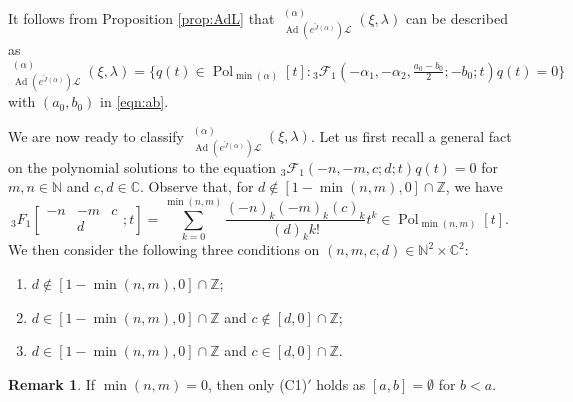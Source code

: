 \documentclass[a4paper,11pt,reqno]{amsart}
\newcommand{\CC}{\mathbb{C}}
\newcommand{\NN}{\mathbb{N}}
\newcommand{\calF}{\mathcal{F}}
\newcommand{\calL}{\mathcal{L}}
\newcommand{\0}{{\bf 0}}
\newcommand{\N}{\mathbb{N}}
\newcommand{\Z}{\mathbb{Z}}
\newcommand{\C}{\mathbb{C}}
\newcommand{\1}{{\bf 1}}
\DeclareMathOperator{\Ad}{Ad}
\DeclareMathOperator{\Pol}{Pol}
\DeclareMathOperator{\Sol}{Sol}
\newcommand{\wJ}{\widetilde{J}}
\DeclareMathOperator{\wSol}{\widetilde{\Sol}}
\theoremstyle{plain}
\theoremstyle{definition}
\newtheorem{remark}[equation]{Remark}
\numberwithin{equation}{section}
\theoremstyle{definition}
\begin{document}
It follows from Proposition \ref{prop:AdL} that 
$\wSol_{\Ad(e^{\wJ(\alpha)}) \calL}^{(\alpha)}(\xi,\lambda)$ can be described as
\begin{equation}\label{eqn:AdSol3F1}
\wSol_{\Ad(e^{\wJ(\alpha)}) \calL}^{(\alpha)}(\xi,\lambda)
=\{q(t) \in \Pol_{\min(\alpha)}[t] : 
{}_3\calF_1(-\alpha_1,-\alpha_2,\tfrac{a_0-b_0}{2};-b_0;t)q(t)=0\}
\end{equation}
with $(a_0, b_0)$ in \eqref{eqn:ab}.

We are now ready to classify 
$\wSol_{\Ad(e^{\wJ(\alpha)}) \calL}^{(\alpha)}(\xi,\lambda)$.
Let us first recall a general fact on the polynomial solutions 
to the equation
${}_3\calF_1(-n,-m,c;d;t)q(t)=0$ for $m, n \in \NN$ and $c, d \in\CC$.
Observe that, for $d \notin [1-\min(n,m),0]\cap \Z$, we have
\begin{equation*}
{}_3F_1\left [\begin{matrix}
    -n& -m & c \\
   & d &  
\end{matrix};t\right ]=\sum_{k=0}^{\min(n,m)}\frac{(-n)_k(-m)_k(c)_k}{(d)_kk!}t^k
\in \Pol_{\min(n,m)}[t].
\end{equation*}
We then consider the following 
three conditions on $(n,m,c, d) \in \N^2\times \C^2$:
\vspace{2pt}
\begin{enumerate}[label=\normalfont{(\arabic*)}]
\item[(C1)$'$] $d \notin [1-\min(n,m),0]\cap \Z$;
\vspace{2pt}
\item[(C2)$'$] $d \in [1-\min(n,m),0]\cap \Z$ and 
$c \notin [d, 0] \cap \Z$;
\vspace{2pt}
\item[(C3)$'$] $d\in [1-\min(n,m),0]\cap \Z$ 
and $c\in [d, 0] \cap \Z$.
\end{enumerate}

\begin{remark}\label{rem:zero-case}
If $\min(n,m)=0$, then only (C1)$'$ holds
as  $[a,b]=\emptyset$ for $b< a$.
\end{remark}
\end{document}
